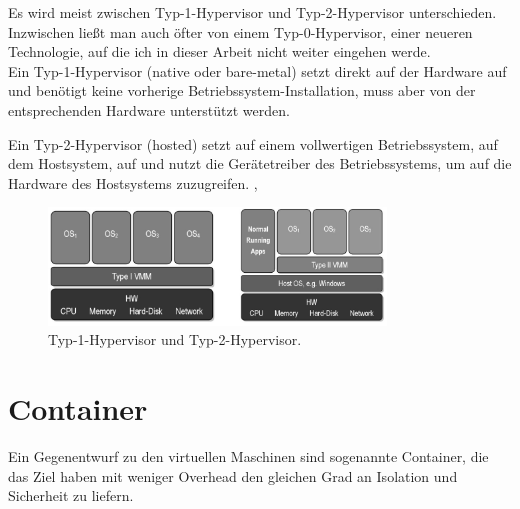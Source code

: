 \noindent Es wird meist zwischen Typ-1-Hypervisor und Typ-2-Hypervisor unterschieden. Inzwischen ließt man auch öfter von einem Typ-0-Hypervisor, einer neueren Technologie, auf die ich in dieser Arbeit nicht weiter eingehen werde.\\

\noindent Ein Typ-1-Hypervisor (native oder bare-metal) setzt direkt auf der Hardware auf und benötigt keine vorherige Betriebssystem-Installation, muss aber von der entsprechenden Hardware unterstützt werden.

\vspace{\baselineskip}

\noindent Ein Typ-2-Hypervisor (hosted) setzt auf einem vollwertigen Betriebssystem, auf dem Hostsystem, auf und nutzt die Gerätetreiber des Betriebssystems, um auf die Hardware des Hostsystems zuzugreifen. \cite{wiki:hyper}, \cite{6903537}\\

\begin{figure}[!ht] %
  \centering
  \includegraphics[width=0.8\textwidth]{images/hypervisors.jpg}
  \caption{Typ-1-Hypervisor und Typ-2-Hypervisor. \cite{wiki:hyper}}
\end{figure}


\section{Container}
Ein Gegenentwurf zu den virtuellen Maschinen sind sogenannte Container, die das Ziel haben mit weniger Overhead den gleichen Grad an Isolation und Sicherheit zu liefern.


